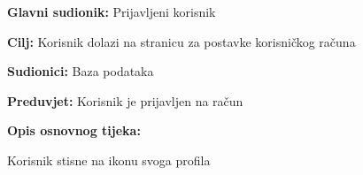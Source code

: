 					\noindent {}
					\begin{packed_item}
						\item \textbf{Glavni sudionik:} Prijavljeni korisnik
						\item \textbf{Cilj:} Korisnik dolazi na stranicu za postavke korisničkog računa
						\item \textbf{Sudionici:} Baza podataka
						\item \textbf{Preduvjet:} Korisnik je prijavljen na račun
						\item \textbf{Opis osnovnog tijeka:}
						\begin{packed_enum}
							\item Korisnik stisne na ikonu svoga profila
						\end{packed_enum}
					\end{packed_item}


